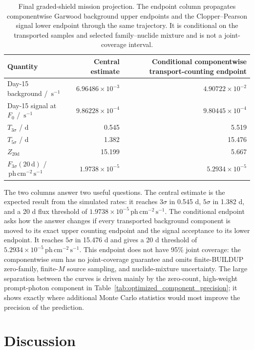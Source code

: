 \documentclass[11pt]{article}
\newcommand{\phcms}{\ensuremath{\,\mathrm{ph\,cm^{-2}\,s^{-1}}}}
\newcommand{\cps}{\ensuremath{\,\mathrm{s^{-1}}}}
\newcommand{\fzero}{F_{0}}
\newcommand{\fthree}{F_{3\sigma}}
\begin{document}
\begin{table}[!ht]
\centering
\caption{Final graded-shield mission projection. The endpoint column propagates componentwise Garwood background upper endpoints and the Clopper--Pearson signal lower endpoint through the same trajectory. It is conditional on the transported samples and selected family--nuclide mixture and is not a joint-coverage interval.}
\label{tab:primary_sensitivity}
\footnotesize
\begin{tabular}{lrr}
\toprule
Quantity & Central estimate & Conditional componentwise transport-counting endpoint \\
\midrule
Day-15 background / $\cps$ & $6.96486\times10^{-3}$ & $4.90722\times10^{-2}$ \\
Day-15 signal at $\fzero$ / $\cps$ & $9.86228\times10^{-4}$ & $9.80445\times10^{-4}$ \\
$T_{3\sigma}$ / d & 0.545 & 5.519 \\
$T_{5\sigma}$ / d & 1.382 & 15.476 \\
$Z_{20\mathrm{d}}$ & 15.199 & 5.667 \\
$\fthree(20\,\mathrm{d})$ / $\phcms$ & $1.9738\times10^{-5}$ & $5.2934\times10^{-5}$ \\
\bottomrule
\end{tabular}
\end{table}

The two columns answer two useful questions. The central estimate is the expected
result from the simulated rates: it reaches $3\sigma$ in 0.545 d, $5\sigma$ in
1.382 d, and a 20 d flux threshold of $1.9738\times10^{-5}\phcms$. The
conditional endpoint asks how the answer changes if every transported background
component is moved to its exact upper counting endpoint and the signal acceptance
to its lower endpoint. It reaches $5\sigma$ in 15.476 d and gives a 20 d threshold
of $5.2934\times10^{-5}\phcms$. This endpoint does not have 95\% joint coverage:
the componentwise sum has no joint-coverage guarantee and omits finite-BUILDUP
zero-family, finite-$M$ source sampling, and nuclide-mixture uncertainty. The large separation between the curves is driven
mainly by the zero-count, high-weight prompt-photon component in
Table~\ref{tab:optimized_component_precision}; it shows exactly where additional
Monte Carlo statistics would most improve the precision of the prediction.

\section{Discussion}
\label{sec:discussion}
\end{document}
